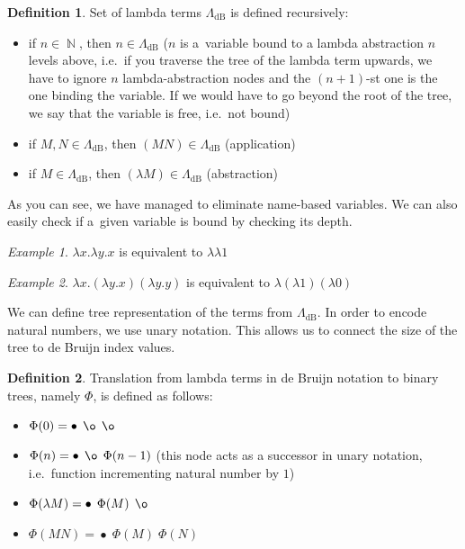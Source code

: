 \documentclass[final]{article}
\theoremstyle{definition}
\newtheorem{definition}{Definition}[subsection]
\theoremstyle{definition}
\theoremstyle{remark}
\newtheorem{example}{Example}[subsection]
\newcommand{\LambdadB}{\ensuremath{\Lambda_{\text{dB}}}}
\DeclareMathOperator{\N}{\mathbb{N}}
\DeclareMathOperator{\n}{\bullet}
\DeclareMathOperator{\no}{\o}
\begin{document}
\begin{definition}
    Set of lambda terms \(\LambdadB\) is defined recursively:
    \begin{itemize}
        \item if \(n \in \N\), then \(n \in \LambdadB\) (\(n\) is a~variable bound to a lambda abstraction \(n\) levels above, i.e.~if you traverse the tree of the lambda term upwards, we have to ignore \(n\) lambda-abstraction nodes and the \((n+1)\)-st one is the one binding the variable. If we would have to go beyond the root of the tree, we say that the variable is free, i.e.~not bound)
        \item if \(M, N \in \LambdadB\), then \((M N) \in \LambdadB\) (application)
        \item if \(M \in \LambdadB\), then \((\lambda M) \in \LambdadB\) (abstraction)
    \end{itemize}
\end{definition}

As you can see, we have managed to eliminate name-based variables. We can also easily check if a~given variable is bound by checking its depth.

\begin{example}
    \(\lambda x.\lambda y.x\) is equivalent to \(\lambda \lambda 1\)
\end{example}

\begin{example}
    \(\lambda x. (\lambda y.x) (\lambda y.y)\) is equivalent to \(\lambda (\lambda 1) (\lambda 0)\)
\end{example}

We can define tree representation of the terms from \(\LambdadB\). In order to encode natural numbers, we use unary notation. This allows us to connect the size of the tree to de Bruijn index values.

\begin{definition}
    Translation from lambda terms in de Bruijn notation to binary trees, namely \(\Phi\), is defined as follows:
    \begin{itemize}
        \item \(\Phi(0) = \n\; \no\; \no\)
        \item \(\Phi(n) = \n\; \no\; \Phi(n - 1)\) (this node acts as a successor in unary notation, i.e.~function incrementing natural number by \(1\))
        \item \(\Phi(\lambda M) = \n\; \Phi(M)\; \no\)
        \item \(\Phi(M N) = \n\; \Phi(M)\; \Phi(N)\)
    \end{itemize}
\end{definition}
\end{document}
